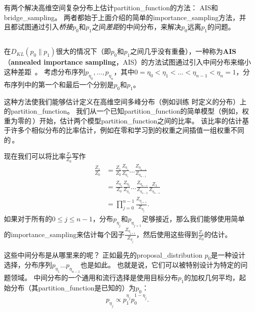 
有两个解决高维空间复杂分布上估计\gls{partition_function}的方法：
\gls{AIS}和\gls{bridge_sampling}。
两者都始于上面介绍的简单的\gls{importance_sampling}方法，并且都试图通过引入\emph{桥接}$p_0$和$p_1$之间\emph{差距}的中间分布，来解决$p_0$远离$p_1$的问题。


\subsection{}
\label{sec:annealed_importance_sampling}
在$D_{KL}(p_0 \| p_1)$很大的情况下（即$p_0$和$p_1$之间几乎没有重叠），一种称为\textbf{\gls{AIS}}（\textbf{annealed importance sampling}，AIS）的方法试图通过引入中间分布来缩小这种差距~\citep{Jarzynski1997,Neal-2001}。
考虑分布序列$p_{\eta_0},\dots,p_{\eta_n}$，其中$0=\eta_0 < \eta_1 < \dots < \eta_{n-1} < \eta_n = 1$，分布序列中的第一个和最后一个分别是$p_0$和$p_1$。


这种方法使我们能够估计定义在高维空间多峰分布（例如训练\,\,时定义的分布）上的\gls{partition_function}。
我们从一个已知\gls{partition_function}的简单模型（例如，权重为零的\,）开始，估计两个模型\gls{partition_function}之间的比率。
该比率的估计基于许多个相似分布的比率估计，例如在零和学习到的权重之间插值一组权重不同的\,。


现在我们可以将比率$\frac{Z_1}{Z_0}$写作
\begin{align}
\frac{Z_1}{Z_0} &= \frac{Z_1}{Z_0} \frac{Z_{\eta_1}}{Z_{\eta_1}} \dots \frac{Z_{\eta_{n-1}}}{Z_{\eta_{n-1}}} \\
&= \frac{Z_{\eta_1}}{Z_{0}}  \frac{Z_{\eta_2}}{Z_{\eta_1}}  \dots \frac{Z_{\eta_{n-1}}}{Z_{\eta_{n-2}}} \frac{Z_{1}}{Z_{\eta_{n-1}}} \\
&= \prod_{j=0}^{n-1} \frac{ Z_{\eta_{j+1}} }{Z_{\eta_j}}. \label{eq:18.49}
\end{align}
如果对于所有的$0 \leq j \leq n-1$，分布$p_{\eta_j}$和$p_{\eta_{j+1}}$足够接近，那么我们能够使用简单的\gls{importance_sampling}来估计每个因子$\frac{Z_{\eta_{j+1}}}{ Z_{\eta_j}}$，然后使用这些得到$\frac{Z_1}{Z_0}$的估计。


这些中间分布是从哪里来的呢？
正如最先的\gls{proposal_distribution} $p_0$是一种设计选择，分布序列$p_{\eta_1} \dots p_{\eta_{n-1}}$也是如此。
也就是说，它们可以被特别设计为特定的问题领域。
中间分布的一个通用和流行选择是使用目标分布$p_1$的加权几何平均，起始分布（其\gls{partition_function}是已知的）为$p_0$：
\begin{equation}
	p_{\eta_j} \propto p_1^{\eta_j} p_0^{1-\eta_j}.
\end{equation}


